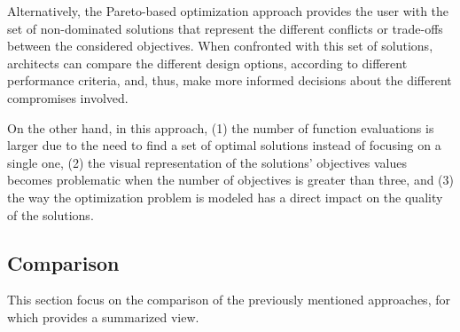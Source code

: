 	Alternatively, the Pareto-based optimization approach provides the user with the set of non-dominated solutions that represent the different conflicts or trade-offs between the considered objectives. When confronted with this set of solutions, architects can compare the different design options, according to different performance criteria, and, thus, make more informed decisions about the different compromises involved. 
	
	On the other hand, in this approach, (1) the number of function evaluations is larger due to the need to find a set of optimal solutions instead of focusing on a single one, (2) the visual representation of the solutions’ objectives values becomes problematic when the number of objectives is greater than three, and (3) the way the optimization problem is modeled has a direct impact on the quality of the solutions.
	
	
	\subsection{Comparison}
	
	This section focus on the comparison of the previously mentioned approaches, for which  provides a summarized view.
	
